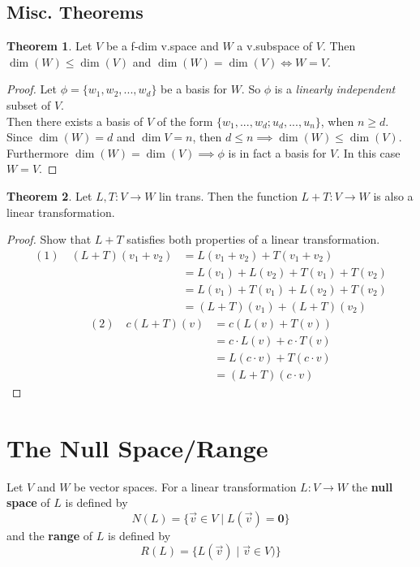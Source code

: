 \documentclass{article}
\renewcommand{\bf}[1]{\textbf{#1}}
\theoremstyle{definition}
\newtheorem{theorem}{Theorem}
\begin{document}
	\subsection{Misc. Theorems}
	\begin{theorem}
		Let $V$ be a f-dim v.space and $W$ a v.subspace of $V$. Then $\dim(W) \leq \dim(V)$ and $\dim(W) = \dim(V) \iff W = V$.
		\begin{proof}
			Let $\phi = \{w_1, w_2, ..., w_d\}$ be a basis for $W$. So $\phi$ is a \emph{linearly independent} subset of $V$.\\
			Then there exists a basis of $V$ of the form $\{w_1,...,w_d; u_d,...,u_n\}$, when $n \geq d$.\\
			Since $\dim(W) = d$ and $\dim{V} = n$, then $d \leq n \implies \dim(W) \leq \dim(V)$.\\
			Furthermore $\dim(W) = \dim(V) \implies \phi$ is in fact a basis for $V$. In this case $W = V$.
		\end{proof}
	\end{theorem}
	\begin{theorem}
		Let $L, T:V \rightarrow W$ lin trans. Then the function $L+T:V \rightarrow W$ is also a linear transformation.
		\begin{proof} Show that $L+T$ satisfies both properties of a linear transformation.
			\begin{align*}
				(1) \quad (L+T)(v_1 + v_2) &= L(v_1 + v_2) + T(v_1 + v_2)\\
				&= L(v_1) + L(v_2) + T(v_1) + T(v_2)\\
				&= L(v_1) + T(v_1) + L(v_2) + T(v_2)\\
				&= (L+T)(v_1) + (L+T)(v_2)
			\end{align*}
			\begin{align*}
				(2) \quad c(L+T)(v) &= c(L(v) + T(v))\\
				&= c\cdot L(v) + c\cdot T(v)\\
				&= L(c \cdot v) + T(c \cdot v)\\
				&= (L+T)(c \cdot v)
			\end{align*}
		\end{proof}
	\end{theorem}
\section{The Null Space/Range}
Let $V$ and $W$ be vector spaces. For a linear transformation $L: V \rightarrow W$ the \textbf{null space} of $L$ is defined by
\[ N(L) = \{ \vec{v} \in V \; | \; L(\vec{v}) = \bf{0} \} \]
and the \textbf{range} of $L$ is defined by
\[ R(L) = \{ L(\vec{v}) \; | \; \vec{v} \in V) \} \]
\end{document}
